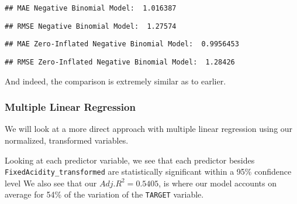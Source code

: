 \documentclass[
]{article}
\begin{document}
\begin{verbatim}
## MAE Negative Binomial Model:  1.016387
\end{verbatim}

\begin{verbatim}
## RMSE Negative Binomial Model:  1.27574
\end{verbatim}

\begin{verbatim}
## MAE Zero-Inflated Negative Binomial Model:  0.9956453
\end{verbatim}

\begin{verbatim}
## RMSE Zero-Inflated Negative Binomial Model:  1.28426
\end{verbatim}

And indeed, the comparison is extremely similar as to earlier.

\subsubsection{Multiple Linear
Regression}\label{multiple-linear-regression}

We will look at a more direct approach with multiple linear regression
using our normalized, transformed variables.

Looking at each predictor variable, we see that each predictor besides
\texttt{FixedAcidity\_transformed} are statistically significant within
a 95\% confidence level We also see that our \(Adj. R^2 = 0.5405\), is
where our model accounts on average for 54\% of the variation of the
\texttt{TARGET} variable.
\end{document}
